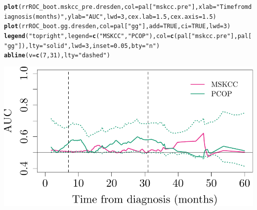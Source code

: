 \documentclass{article}\usepackage[]{graphicx}\usepackage[]{color}
\makeatletter
\def\maxwidth{ %
  \ifdim\Gin@nat@width>\linewidth
    \linewidth
  \else
    \Gin@nat@width
  \fi
}
\newcommand{\hlnum}[1]{\textcolor[rgb]{0.686,0.059,0.569}{#1}}%
\newcommand{\hlstr}[1]{\textcolor[rgb]{0.192,0.494,0.8}{#1}}%
\newcommand{\hlstd}[1]{\textcolor[rgb]{0.345,0.345,0.345}{#1}}%
\newcommand{\hlkwc}[1]{\textcolor[rgb]{0.333,0.667,0.333}{#1}}%
\newcommand{\hlkwd}[1]{\textcolor[rgb]{0.737,0.353,0.396}{\textbf{#1}}}%
\newenvironment{kframe}{%
 \def\at@end@of@kframe{}%
 \ifinner\ifhmode%
  \def\at@end@of@kframe{\end{minipage}}%
  \begin{minipage}{\columnwidth}%
 \fi\fi%
 \def\FrameCommand##1{\hskip\@totalleftmargin \hskip-\fboxsep
 \colorbox{shadecolor}{##1}\hskip-\fboxsep
     \hskip-\linewidth \hskip-\@totalleftmargin \hskip\columnwidth}%
 \MakeFramed {\advance\hsize-\width
   \@totalleftmargin\z@ \linewidth\hsize
   \@setminipage}}%
 {\par\unskip\endMakeFramed%
 \at@end@of@kframe}
\newenvironment{knitrout}{}{} %
\makeatother
\begin{document}
\begin{knitrout}
\color{fgcolor}\begin{kframe}
\begin{alltt}
\hlkwd{plot}\hlstd{(rrROC_boot.mskcc_pre.dresden,} \hlkwc{col} \hlstd{= pal[}\hlstr{"mskcc.pre"}\hlstd{],} \hlkwc{xlab} \hlstd{=} \hlstr{"Time from diagnosis (months)"}\hlstd{,} \hlkwc{ylab} \hlstd{=} \hlstr{"AUC"}\hlstd{,} \hlkwc{lwd} \hlstd{=} \hlnum{3}\hlstd{,} \hlkwc{cex.lab} \hlstd{=} \hlnum{1.5}\hlstd{,} \hlkwc{cex.axis} \hlstd{=} \hlnum{1.5}\hlstd{)}
\hlkwd{plot}\hlstd{(rrROC_boot.gg.dresden,} \hlkwc{col} \hlstd{= pal[}\hlstr{"gg"}\hlstd{],} \hlkwc{add} \hlstd{=} \hlnum{TRUE}\hlstd{,} \hlkwc{ci} \hlstd{=} \hlnum{TRUE}\hlstd{,} \hlkwc{lwd} \hlstd{=} \hlnum{3}\hlstd{)}
\hlkwd{legend}\hlstd{(}\hlstr{"topright"}\hlstd{,} \hlkwc{legend} \hlstd{=} \hlkwd{c}\hlstd{(}\hlstr{"MSKCC"}\hlstd{,} \hlstr{"PCOP"}\hlstd{),} \hlkwc{col} \hlstd{=} \hlkwd{c}\hlstd{(pal[}\hlstr{"mskcc.pre"}\hlstd{], pal[}\hlstr{"gg"}\hlstd{]),} \hlkwc{lty} \hlstd{=} \hlstr{"solid"}\hlstd{,} \hlkwc{lwd} \hlstd{=} \hlnum{3}\hlstd{,} \hlkwc{inset} \hlstd{=} \hlnum{0.05}\hlstd{,} \hlkwc{bty} \hlstd{=} \hlstr{"n"}\hlstd{)}
\hlkwd{abline}\hlstd{(}\hlkwc{v} \hlstd{=} \hlkwd{c}\hlstd{(}\hlnum{7}\hlstd{,} \hlnum{31}\hlstd{),} \hlkwc{lty} \hlstd{=} \hlstr{"dashed"}\hlstd{)}
\end{alltt}
\end{kframe}

{\centering \includegraphics[width=\maxwidth]{figure/07-risksetROC-plot-dresden-1} 

}



\end{knitrout}
\end{document}
